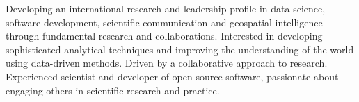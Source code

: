 \vspace{0.25cm}

\begin{cvparagraph}

Developing an international research and leadership profile in data science, software development, scientific communication and geospatial intelligence through fundamental research and collaborations. 
Interested in developing sophisticated analytical techniques and improving the understanding of the world using data-driven methods.
Driven by a collaborative approach to research.
Experienced scientist and developer of open-source software, passionate about engaging others in scientific research and practice. 
\end{cvparagraph}